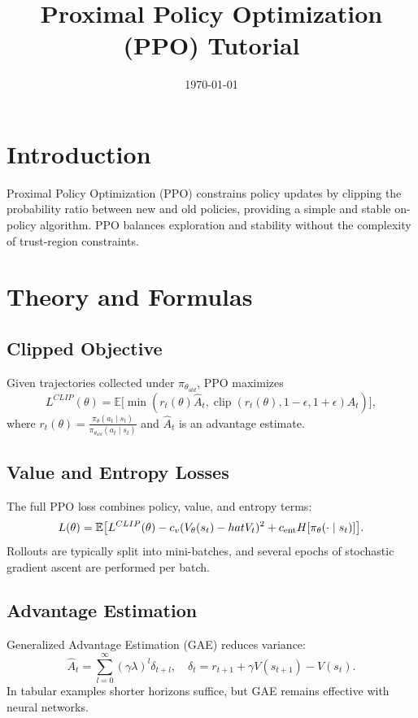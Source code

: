 ﻿\documentclass[12pt]{article}
\title{Proximal Policy Optimization (PPO) Tutorial}
\author{}
\date{\today}
\begin{document}
\maketitle

\section{Introduction}
Proximal Policy Optimization (PPO) constrains policy updates by clipping the probability ratio between new and old policies, providing a simple and stable on-policy algorithm. PPO balances exploration and stability without the complexity of trust-region constraints.

\section{Theory and Formulas}
\subsection{Clipped Objective}
Given trajectories collected under \(\pi_{\theta_{old}}\), PPO maximizes
\begin{equation}
L^{CLIP}(\theta) = \mathbb{E}\big[ \min( r_t(\theta) \hat{A}_t, \operatorname{clip}(r_t(\theta), 1 - \epsilon, 1 + \epsilon) \hat{A}_t ) \big],
\end{equation}
where \(r_t(\theta) = \frac{\pi_\theta(a_t\mid s_t)}{\pi_{\theta_{old}}(a_t\mid s_t)}\) and \(\hat{A}_t\) is an advantage estimate.

\subsection{Value and Entropy Losses}
The full PPO loss combines policy, value, and entropy terms:
\begin{equation}
L(\theta) = \mathbb{E}\big[ L^{CLIP}(\theta) - c_v (V_\theta(s_t) - \\hat{V}_t)^2 + c_{\text{ent}} H[\pi_\theta(\cdot\mid s_t)] \big].
\end{equation}
Rollouts are typically split into mini-batches, and several epochs of stochastic gradient ascent are performed per batch.

\subsection{Advantage Estimation}
Generalized Advantage Estimation (GAE) reduces variance:
\begin{equation}
\hat{A}_t = \sum_{l=0}^{\infty} (\gamma \lambda)^l \delta_{t+l},\quad \delta_t = r_{t+1} + \gamma V(s_{t+1}) - V(s_t).
\end{equation}
In tabular examples shorter horizons suffice, but GAE remains effective with neural networks.
\end{document}
